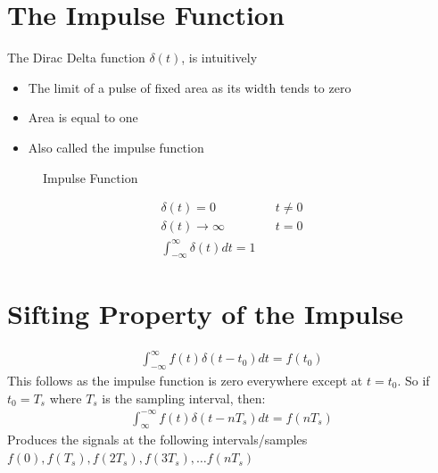 \documentclass[oneside]{book}
\begin{document}
        \section{The Impulse Function}
            The Dirac Delta function $\delta(t)$, is intuitively
            \begin{itemize}
                \item The limit of a pulse of fixed area as its width tends to zero
                \item Area is equal to one
                \item Also called the impulse function
            \end{itemize}
            \begin{minipage}{0.5\linewidth}
                \begin{figure}[H]
                    \centering
                    \caption{Impulse Function}
                    \label{fig:impulse_function}
                \end{figure}
            \end{minipage}
            \begin{minipage}{0.5\linewidth}
                \begin{align*}
                    \delta (t) = 0 && t\neq 0\\
                    \delta (t) \rightarrow \infty && t=0\\
                    \int_{-\infty}^{\infty} \delta (t) dt = 1
                \end{align*}
            \end{minipage}
        \section{Sifting Property of the Impulse}
            \begin{align*}
                \int^{\infty}_{-\infty} f(t)\delta(t-t_0)dt = f(t_0) \tag{$f(t)$ is continuous}
            \end{align*}
            This follows as the impulse function is zero everywhere except at $t=t_0$. So if $t_0 = T_s$ where
            $T_s$ is the sampling interval, then:
            \begin{align*}
                \int_{\infty}^{-\infty} f(t)\delta(t-nT_s)dt = f(nT_s)
            \end{align*}
            Produces the signals at the following intervals/samples $f(0), f(T_s), f(2T_s), f(3T_s), \dots f(nT_s)$
\end{document}
